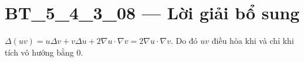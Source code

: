 \documentclass[10pt,a4paper]{article}
\begin{document}
\section*{BT\_5\_4\_3\_08 — Lời giải bổ sung}
$\Delta(uv)=u\Delta v+v\Delta u+2\nabla u\cdot\nabla v=2\nabla u\cdot\nabla v$. Do đó $uv$ điều hòa khi và chỉ khi tích vô hướng bằng 0.
\end{document}
